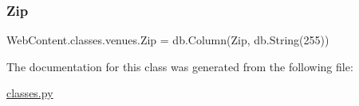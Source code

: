 \subsubsection{\texorpdfstring{Zip}{Zip}}
{\footnotesize\ttfamily Web\+Content.\+classes.\+venues.\+Zip = db.\+Column(\textquotesingle{}Zip\textquotesingle{}, db.\+String(255))\hspace{0.3cm}{\ttfamily [static]}}



The documentation for this class was generated from the following file\+:\begin{DoxyCompactItemize}
\item 
\hyperlink{classes_8py}{classes.\+py}\end{DoxyCompactItemize}
